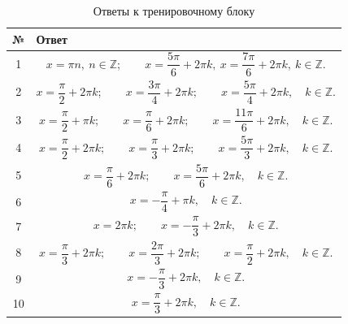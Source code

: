 \documentclass[a4paper,12pt]{article}
\begin{document}
\renewcommand{\arraystretch}{1.45}

\begin{table}[h!]
\centering
\caption{Ответы к тренировочному блоку}
\begin{tabularx}{\linewidth}{@{}cX@{}}
\toprule
\textbf{№} & \textbf{Ответ}\\
\midrule

1 &
\[
x=\pi n,\ n\in\mathbb Z;
\qquad
x=\frac{5\pi}{6}+2\pi k,\ 
x=\frac{7\pi}{6}+2\pi k,\ k\in\mathbb Z.
\]
\\

2 &
\[
x=\frac{\pi}{2}+2\pi k;\qquad
x=\frac{3\pi}{4}+2\pi k;\qquad
x=\frac{5\pi}{4}+2\pi k,\quad k\in\mathbb Z.
\]
\\

3 &
\[
x=\frac{\pi}{2}+\pi k;\qquad
x=\frac{\pi}{6}+2\pi k;\qquad
x=\frac{11\pi}{6}+2\pi k,\quad k\in\mathbb Z.
\]
\\

4 &
\[
x=\frac{\pi}{2}+2\pi k;\qquad
x=\frac{\pi}{3}+2\pi k;\qquad
x=\frac{5\pi}{3}+2\pi k,\quad k\in\mathbb Z.
\]
\\

5 &
\[
x=\frac{\pi}{6}+2\pi k;\qquad
x=\frac{5\pi}{6}+2\pi k,\quad k\in\mathbb Z.
\]
\\

6 &
\[
x=-\frac{\pi}{4}+\pi k,\quad k\in\mathbb Z.
\]
\\

7 &
\[
x=2\pi k;\qquad
x=-\frac{\pi}{3}+2\pi k,\quad k\in\mathbb Z.
\]
\\

8 &
\[
x=\frac{\pi}{3}+2\pi k;\qquad
x=\frac{2\pi}{3}+2\pi k;\qquad
x=\frac{\pi}{2}+2\pi k,\quad k\in\mathbb Z.
\]
\\

9 &
\[
x=-\frac{\pi}{3}+2\pi k,\quad k\in\mathbb Z.
\]
\\

10 &
\[
x=\frac{\pi}{3}+2\pi k,\quad k\in\mathbb Z.
\]
\\

\bottomrule
\end{tabularx}
\end{table}
\end{document}
